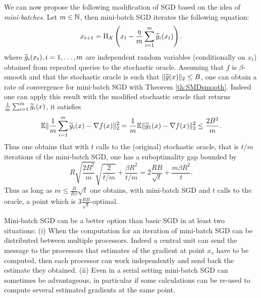 We can now propose the following modification of SGD based on the idea of {\em mini-batches}. Let $m \in \mathbb{N}$, then mini-batch SGD iterates the following equation:
$$x_{t+1} = \Pi_{\mathcal{X}}\left(x_t - \frac{\eta}{m} \sum_{i=1}^m \widetilde{g}_i(x_t)\right).$$
where $\widetilde{g}_i(x_t), i=1,\hdots,m$ are independent random variables (conditionally on $x_t$) obtained from repeated queries to the stochastic oracle. Assuming that $f$ is $\beta$-smooth and that the stochastic oracle is such that $\|\widetilde{g}(x)\|_2 \leq B$, one can obtain a rate of convergence for mini-batch SGD with Theorem \ref{th:SMDsmooth}. Indeed one can apply this result with the modified stochastic oracle that returns $\frac{1}{m} \sum_{i=1}^m \widetilde{g}_i(x)$, it satisfies
$$\mathbb{E} \| \frac1{m} \sum_{i=1}^m \widetilde{g}_i(x) - \nabla f(x) \|_2^2 = \frac{1}{m}\mathbb{E} \| \widetilde{g}_1(x) - \nabla f(x) \|_2^2 \leq \frac{2 B^2}{m} .$$
Thus one obtains that with $t$ calls to the (original) stochastic oracle, that is $t/m$ iterations of the mini-batch SGD, one has a suboptimality gap bounded by
$$R \sqrt{\frac{2 B^2}{m}} \sqrt{\frac{2}{t/m}} + \frac{\beta R^2}{t/m} = 2 \frac{R B}{\sqrt{t}} + \frac{m \beta R^2}{t} .$$
Thus as long as $m \leq \frac{B}{R \beta} \sqrt{t}$ one obtains, with mini-batch SGD and $t$ calls to the oracle, a point which is $3\frac{R B}{\sqrt{t}}$-optimal.

Mini-batch SGD can be a better option than basic SGD in at least two situations: (i) When the computation for an iteration of mini-batch SGD can be distributed between multiple processors. Indeed a central unit can send the message to the processors that estimates of the gradient at point $x_s$ have to be computed, then each processor can work independently and send back the estimate they obtained. (ii) Even in a serial setting mini-batch SGD can sometimes be advantageous, in particular if some calculations can be re-used to compute several estimated gradients at the same point.

